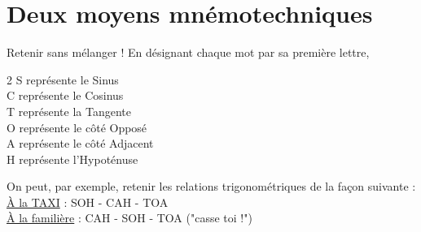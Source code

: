 \section{Deux moyens mnémotechniques}
\begin{center}
    \begin{myBox}{Retenir sans mélanger !}
        En désignant chaque mot par sa première lettre,\\
        \begin{multicols}{2}
            S représente le Sinus\\
            C représente le Cosinus\\
            T représente la Tangente\\
            O représente le côté Opposé\\
            A représente le côté Adjacent\\
            H représente l'Hypoténuse\\        
        \end{multicols}
        
        \bigskip
        On peut, par exemple, retenir les relations trigonométriques de la fa\c con suivante :\\
        \underline{À la TAXI} : SOH - CAH - TOA\\
        \underline{À la familière} : CAH - SOH - TOA ("casse toi !")        
    \end{myBox}
\end{center}
